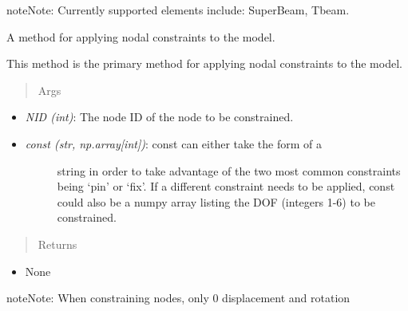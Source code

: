 \documentclass[letterpaper,10pt,english]{sphinxmanual}
\begin{document}
\begin{fulllineitems}
\begin{fulllineitems}
\begin{notice}{note}{Note:}
Currently supported elements include: SuperBeam, Tbeam.
\end{notice}

\end{fulllineitems}


\begin{fulllineitems}
\label{FEM:AeroComBAT.FEM.Model.applyConstraints}
A method for applying nodal constraints to the model.

This method is the primary method for applying nodal constraints to the
model.
\begin{quote}\begin{description}
\item[{Args}] \leavevmode
\end{description}\end{quote}
\begin{itemize}
\item {} 
\emph{NID (int)}: The node ID of the node to be constrained.

\item {} \begin{description}
\item[{\emph{const (str, np.array{[}int{]})}: const can either take the form of a}] \leavevmode
string in order to take advantage of the two most common
constraints being `pin' or `fix'. If a different constraint needs
to be applied, const could also be a numpy array listing the DOF
(integers 1-6) to be constrained.

\end{description}

\end{itemize}
\begin{quote}\begin{description}
\item[{Returns}] \leavevmode
\end{description}\end{quote}
\begin{itemize}
\item {} 
None

\end{itemize}

\begin{notice}{note}{Note:}
When constraining nodes, only 0 displacement and rotation
\end{notice}


\end{fulllineitems}
\end{fulllineitems}
\end{document}
